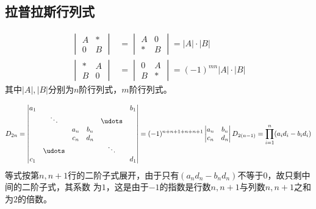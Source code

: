 \subsection{拉普拉斯行列式}
\begin{align}
    \label{eq:拉普拉斯行列式}
    \begin{vmatrix}
        A & * \\
        0 & B
    \end{vmatrix}
     & =
    \begin{vmatrix}
        A & 0 \\
        * & B
    \end{vmatrix}
    = |A| \cdot |B|
    \\
    \begin{vmatrix}
        * & A \\
        B & 0
    \end{vmatrix}
     & =
    \begin{vmatrix}
        0 & A \\
        B & *
    \end{vmatrix}
    = (-1)^{mn} |A| \cdot |B|
\end{align}
其中$|A|,|B|$分别为$n$阶行列式，$m$阶行列式。

\begin{equation}
    D_{2n}=
    \begin{vmatrix}
        a_1 &        &     &     &        & b_1 \\
            & \ddots &     &     & \udots &     \\
            &        & a_n & b_n &        &     \\
            &        & c_n & d_n &        &     \\
            & \udots &     &     & \ddots &     \\
        c_1 &        &     &     &        & d_1
    \end{vmatrix}
    =
    (-1)^{n+n+1+n+n+1}
    \begin{vmatrix}
        a_n & b_n \\
        c_n & d_n
    \end{vmatrix}
    D_{2(n-1)}
    =
    \prod_{i=1}^n (a_id_i-b_id_i)
\end{equation}
等式按第$n,n+1$行的二阶子式展开，由于只有$(a_nd_n-b_nd_n)$不等于$0$，故只剩中间的二阶子式，其系数
为$1$，这是由于$-1$的指数是行数$n,n+1$与列数$n,n+1$之和为$2$的倍数。



